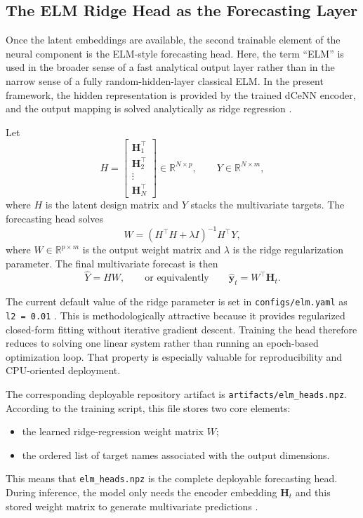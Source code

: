 \subsection{The ELM Ridge Head as the Forecasting Layer}

Once the latent embeddings are available, the second trainable element of the neural component is the ELM-style forecasting head. Here, the term ``ELM'' is used in the broader sense of a fast analytical output layer rather than in the narrow sense of a fully random-hidden-layer classical ELM. In the present framework, the hidden representation is provided by the trained dCeNN encoder, and the output mapping is solved analytically as ridge regression \cite{huang2006extreme,hoerl1970ridge}.

Let
\begin{equation}
	H =
	\begin{bmatrix}
		\mathbf{H}_1^{\top} \\
		\mathbf{H}_2^{\top} \\
		\vdots \\
		\mathbf{H}_N^{\top}
	\end{bmatrix}
	\in \mathbb{R}^{N \times p},
	\qquad
	Y \in \mathbb{R}^{N \times m},
	\label{eq:elm_matrices}
\end{equation}
where $H$ is the latent design matrix and $Y$ stacks the multivariate targets. The forecasting head solves
\begin{equation}
	W = \left(H^{\top}H + \lambda I\right)^{-1}H^{\top}Y,
	\label{eq:elm_ridge_ch42}
\end{equation}
where $W \in \mathbb{R}^{p \times m}$ is the output weight matrix and $\lambda$ is the ridge regularization parameter. The final multivariate forecast is then
\begin{equation}
	\hat{Y} = HW,
	\qquad\text{or equivalently}\qquad
	\hat{\mathbf{y}}_t = W^{\top}\mathbf{H}_t.
	\label{eq:elm_prediction_ch42}
\end{equation}

The current default value of the ridge parameter is set in \texttt{configs/elm.yaml} as \texttt{l2 = 0.01} \cite{repo_thesis_grid_anomaly}. This is methodologically attractive because it provides regularized closed-form fitting without iterative gradient descent. Training the head therefore reduces to solving one linear system rather than running an epoch-based optimization loop. That property is especially valuable for reproducibility and CPU-oriented deployment.

The corresponding deployable repository artifact is \texttt{artifacts/elm\_heads.npz}. According to the training script, this file stores two core elements:
\begin{itemize}
	\item the learned ridge-regression weight matrix $W$;
	\item the ordered list of target names associated with the output dimensions.
\end{itemize}
This means that \texttt{elm\_heads.npz} is the complete deployable forecasting head. During inference, the model only needs the encoder embedding $\mathbf{H}_t$ and this stored weight matrix to generate multivariate predictions \cite{repo_thesis_grid_anomaly}.

